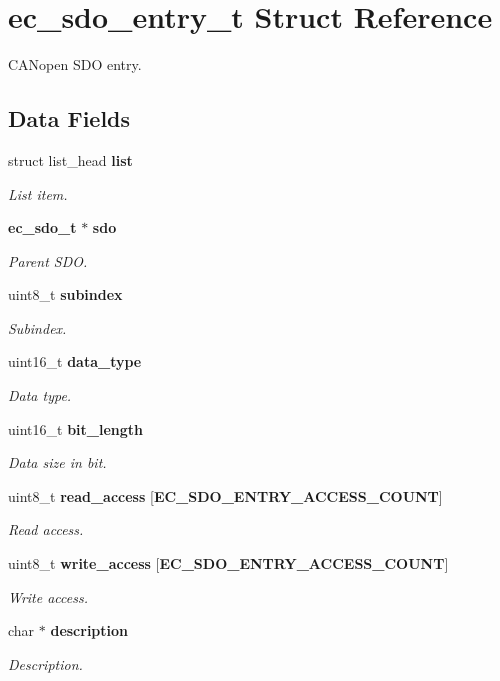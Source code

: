 \section{ec\-\_\-sdo\-\_\-entry\-\_\-t Struct Reference}
\label{structec__sdo__entry__t}


C\-A\-Nopen S\-D\-O entry.  


\subsection*{Data Fields}
\begin{DoxyCompactItemize}
\item 
struct list\-\_\-head {\bf list}
\begin{DoxyCompactList}\small\item\em List item. \end{DoxyCompactList}\item 
{\bf ec\-\_\-sdo\-\_\-t} $\ast$ {\bf sdo}
\begin{DoxyCompactList}\small\item\em Parent S\-D\-O. \end{DoxyCompactList}\item 
uint8\-\_\-t {\bf subindex}
\begin{DoxyCompactList}\small\item\em Subindex. \end{DoxyCompactList}\item 
uint16\-\_\-t {\bf data\-\_\-type}
\begin{DoxyCompactList}\small\item\em Data type. \end{DoxyCompactList}\item 
uint16\-\_\-t {\bf bit\-\_\-length}
\begin{DoxyCompactList}\small\item\em Data size in bit. \end{DoxyCompactList}\item 
uint8\-\_\-t {\bf read\-\_\-access} [{\bf E\-C\-\_\-\-S\-D\-O\-\_\-\-E\-N\-T\-R\-Y\-\_\-\-A\-C\-C\-E\-S\-S\-\_\-\-C\-O\-U\-N\-T}]
\begin{DoxyCompactList}\small\item\em Read access. \end{DoxyCompactList}\item 
uint8\-\_\-t {\bf write\-\_\-access} [{\bf E\-C\-\_\-\-S\-D\-O\-\_\-\-E\-N\-T\-R\-Y\-\_\-\-A\-C\-C\-E\-S\-S\-\_\-\-C\-O\-U\-N\-T}]
\begin{DoxyCompactList}\small\item\em Write access. \end{DoxyCompactList}\item 
char $\ast$ {\bf description}
\begin{DoxyCompactList}\small\item\em Description. \end{DoxyCompactList}\end{DoxyCompactItemize}


